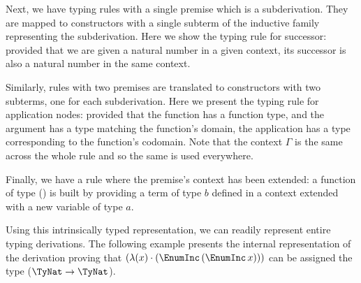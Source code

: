 Next, we have typing rules with a single premise which is a subderivation.
They are mapped to constructors with a single subterm of the inductive family
representing the subderivation.
%
Here we show the typing rule for successor: provided that we are given
a natural number in a given context, its successor is also a natural
number in the same context.

\begin{center}
\begin{minipage}{0.45\textwidth}
\inferenceInc
\end{minipage}\hfill
\begin{minipage}{0.45\textwidth}
\end{minipage}
\end{center}

Similarly, rules with two premises are translated to constructors
with two subterms, one for each subderivation.
%
Here we present the typing rule for application nodes: provided that
the function has a function type, and the argument has a type matching
the function's domain, the application has a type corresponding to the
function's codomain.
Note that the context $\Gamma$ is the same across the whole rule and
so the same  is used everywhere.


\begin{center}
\begin{minipage}{0.35\textwidth}
\inferenceApp
\end{minipage}\hfill
\begin{minipage}{0.55\textwidth}
\end{minipage}
\end{center}

Finally, we have a rule where the premise's context has been extended:
a function of type () is built by providing a term
of type $b$ defined in a context extended with a new variable of type $a$.

\begin{center}
\begin{minipage}{0.35\textwidth}
\inferenceFunc
\end{minipage}\hfill
\begin{minipage}{0.55\textwidth}
\end{minipage}
\end{center}

Using this intrinsically typed representation, we can readily represent
entire typing derivations.
%
The following example presents the internal representation
 of the derivation proving that
$\exprLam{\exprInc{\exprInc{x}}}$ can be
assigned the type ($\TyFunc{\TyNat}{\TyNat}$).

